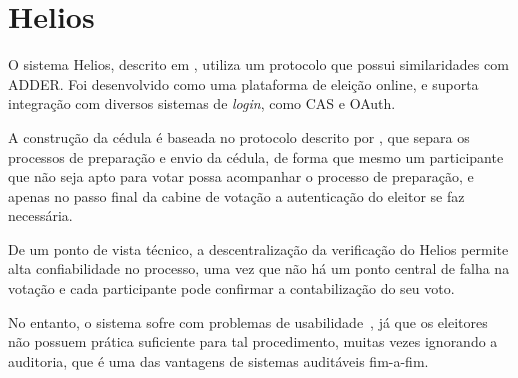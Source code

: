 \section{Helios}

O sistema Helios, descrito em \textcite{adida2008helios}, utiliza um protocolo
que possui similaridades com ADDER. Foi desenvolvido como uma plataforma de
eleição online, e suporta integração com diversos sistemas de \textit{login},
como CAS e OAuth.

A construção da cédula é baseada no protocolo descrito por
\textcite{benaloh2006simple}, que separa os processos de preparação e envio da
cédula, de forma que mesmo um participante que não seja apto para votar possa
acompanhar o processo de preparação, e apenas no passo final da cabine de
votação a autenticação do eleitor se faz necessária.

De um ponto de vista técnico, a descentralização da verificação do Helios
permite alta confiabilidade no processo, uma vez que não há um ponto central de
falha na votação e cada participante pode confirmar a contabilização do seu
voto.

No entanto, o sistema sofre com problemas de
usabilidade~\cite{karayumak2011usability}, já que os eleitores não possuem
prática suficiente para tal procedimento, muitas vezes ignorando a auditoria,
que é uma das vantagens de sistemas auditáveis fim-a-fim.
